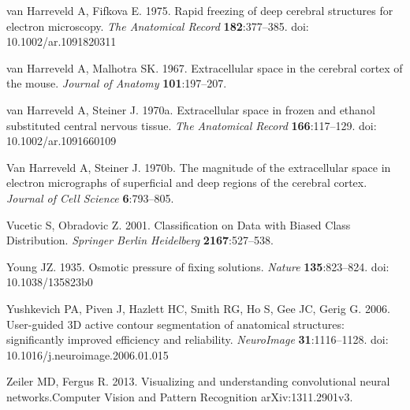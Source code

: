 \documentclass{article}
\begin{document}
\begin{hangpars}
van Harreveld A, Fifkova E. 1975. Rapid freezing of deep cerebral structures for electron microscopy. \emph{The Anatomical Record} \textbf{182}:377–385. doi: 10.1002/ar.1091820311

van Harreveld A, Malhotra SK. 1967. Extracellular space in the cerebral cortex of the mouse. \emph{Journal of Anatomy} \textbf{101}:197–207.

van Harreveld A, Steiner J. 1970a. Extracellular space in frozen and ethanol substituted central nervous tissue. \emph{The Anatomical Record} \textbf{166}:117–129. doi: 10.1002/ar.1091660109

Van Harreveld A, Steiner J. 1970b. The magnitude of the extracellular space in electron micrographs of superficial and deep regions of the cerebral cortex. \emph{Journal of Cell Science} \textbf{6}:793–805.

Vucetic S, Obradovic Z. 2001. Classification on Data with Biased Class Distribution. \emph{Springer Berlin Heidelberg} \textbf{2167}:527–538.

Young JZ. 1935. Osmotic pressure of fixing solutions. \emph{Nature} \textbf{135}:823–824. doi: 10.1038/135823b0

Yushkevich PA, Piven J, Hazlett HC, Smith RG, Ho S, Gee JC, Gerig G. 2006. User-guided 3D active contour segmentation of anatomical structures: significantly improved efficiency and reliability. \emph{NeuroImage} \textbf{31}:1116–1128. doi: 10.1016/j.neuroimage.2006.01.015

Zeiler MD, Fergus R. 2013. Visualizing and understanding convolutional neural networks.Computer Vision and Pattern Recognition arXiv:1311.2901v3.
\end{hangpars}
\end{document}
